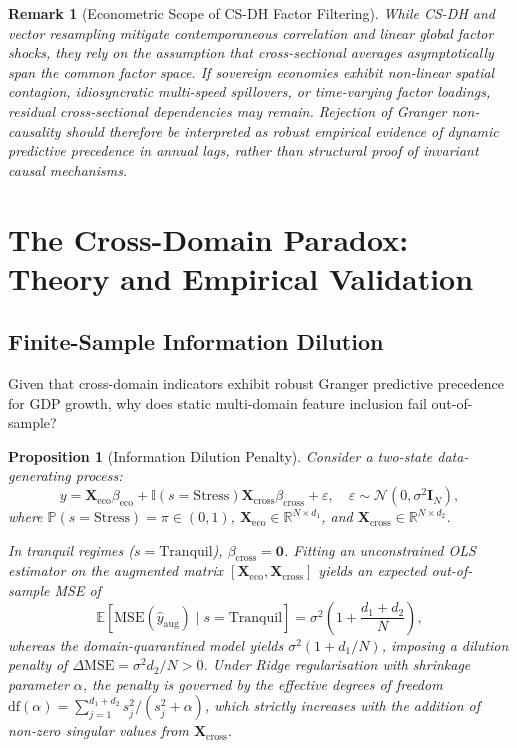 \documentclass[11pt,a4paper]{article}
\newtheorem{proposition}{Proposition}
\newtheorem{remark}{Remark}
\begin{document}
\begin{remark}[Econometric Scope of CS-DH Factor Filtering]
While CS-DH and vector resampling mitigate contemporaneous correlation and linear global factor shocks, they rely on the assumption that cross-sectional averages asymptotically span the common factor space. If sovereign economies exhibit non-linear spatial contagion, idiosyncratic multi-speed spillovers, or time-varying factor loadings, residual cross-sectional dependencies may remain. Rejection of Granger non-causality should therefore be interpreted as robust empirical evidence of dynamic predictive precedence in annual lags, rather than structural proof of invariant causal mechanisms.
\end{remark}




\section{The Cross-Domain Paradox: Theory and Empirical Validation}
\label{sec:paradox}

\subsection{Finite-Sample Information Dilution}

Given that cross-domain indicators exhibit robust Granger predictive precedence for GDP growth, why does static multi-domain feature inclusion fail out-of-sample?


\begin{proposition}[Information Dilution Penalty]
\label{prop:dilution}
Consider a two-state data-generating process:
\begin{equation}
y = \mathbf{X}_{\text{eco}} \beta_{\text{eco}} + \mathbb{I}(s = \text{Stress}) \mathbf{X}_{\text{cross}} \beta_{\text{cross}} + \varepsilon, \quad \varepsilon \sim \mathcal{N}(0, \sigma^2 \mathbf{I}_N),
\end{equation}
where $\mathbb{P}(s = \text{Stress}) = \pi \in (0, 1)$, $\mathbf{X}_{\text{eco}} \in \mathbb{R}^{N \times d_1}$, and $\mathbf{X}_{\text{cross}} \in \mathbb{R}^{N \times d_2}$.

In tranquil regimes ($s = \text{Tranquil}$), $\beta_{\text{cross}} = \mathbf{0}$. Fitting an unconstrained OLS estimator on the augmented matrix $[\mathbf{X}_{\text{eco}}, \mathbf{X}_{\text{cross}}]$ yields an expected out-of-sample MSE of
\begin{equation}
\mathbb{E}[\text{MSE}(\hat{y}_{\text{aug}}) \mid s = \text{Tranquil}] = \sigma^2 \left( 1 + \frac{d_1 + d_2}{N} \right),
\end{equation}
whereas the domain-quarantined model yields $\sigma^2 (1 + d_1/N)$, imposing a dilution penalty of $\Delta \text{MSE} = \sigma^2 d_2/N > 0$. Under Ridge regularisation with shrinkage parameter $\alpha$, the penalty is governed by the effective degrees of freedom $\text{df}(\alpha) = \sum_{j=1}^{d_1+d_2} s_j^2 / (s_j^2 + \alpha)$, which strictly increases with the addition of non-zero singular values from $\mathbf{X}_{\text{cross}}$.
\end{proposition}
\end{document}
